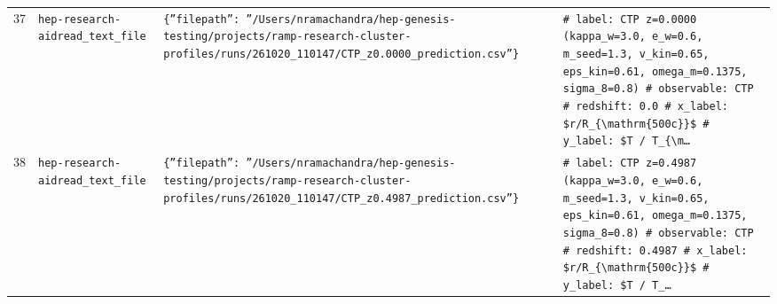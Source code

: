 \documentclass[11pt,a4paper]{article}
\begin{document}
\begin{longtable}{@{}p{}p{}p{}p{}@{}}
37 & \texttt{hep-research-aid}\newline\texttt{read\_\allowbreak{}text\_\allowbreak{}file} & \texttt{\{''filepath'':\allowbreak{} ''/\allowbreak{}Users/\allowbreak{}nramachandra/\allowbreak{}hep-genesis-testing/\allowbreak{}projects/\allowbreak{}ramp-research-cluster-profiles/\allowbreak{}runs/\allowbreak{}261020\_\allowbreak{}110147/\allowbreak{}CTP\_\allowbreak{}z0.0000\_\allowbreak{}prediction.csv''\}\allowbreak{}} & \texttt{\# label:\allowbreak{} CTP z=\allowbreak{}0.0000 (kappa\_\allowbreak{}w=\allowbreak{}3.0,\allowbreak{} e\_\allowbreak{}w=\allowbreak{}0.6,\allowbreak{} m\_\allowbreak{}seed=\allowbreak{}1.3,\allowbreak{} v\_\allowbreak{}kin=\allowbreak{}0.65,\allowbreak{} eps\_\allowbreak{}kin=\allowbreak{}0.61,\allowbreak{} omega\_\allowbreak{}m=\allowbreak{}0.1375,\allowbreak{} sigma\_\allowbreak{}8=\allowbreak{}0.8)\allowbreak{} \# observable:\allowbreak{} CTP \# redshift:\allowbreak{} 0.0 \# x\_\allowbreak{}label:\allowbreak{} \$r/\allowbreak{}R\_\allowbreak{}\{\textbackslash{}\allowbreak{}mathrm\{500c\}\allowbreak{}\}\allowbreak{}\$ \# y\_\allowbreak{}label:\allowbreak{} \$T /\allowbreak{} T\_\allowbreak{}\{\textbackslash{}\allowbreak{}m\ldots{}\allowbreak{}} \\
38 & \texttt{hep-research-aid}\newline\texttt{read\_\allowbreak{}text\_\allowbreak{}file} & \texttt{\{''filepath'':\allowbreak{} ''/\allowbreak{}Users/\allowbreak{}nramachandra/\allowbreak{}hep-genesis-testing/\allowbreak{}projects/\allowbreak{}ramp-research-cluster-profiles/\allowbreak{}runs/\allowbreak{}261020\_\allowbreak{}110147/\allowbreak{}CTP\_\allowbreak{}z0.4987\_\allowbreak{}prediction.csv''\}\allowbreak{}} & \texttt{\# label:\allowbreak{} CTP z=\allowbreak{}0.4987 (kappa\_\allowbreak{}w=\allowbreak{}3.0,\allowbreak{} e\_\allowbreak{}w=\allowbreak{}0.6,\allowbreak{} m\_\allowbreak{}seed=\allowbreak{}1.3,\allowbreak{} v\_\allowbreak{}kin=\allowbreak{}0.65,\allowbreak{} eps\_\allowbreak{}kin=\allowbreak{}0.61,\allowbreak{} omega\_\allowbreak{}m=\allowbreak{}0.1375,\allowbreak{} sigma\_\allowbreak{}8=\allowbreak{}0.8)\allowbreak{} \# observable:\allowbreak{} CTP \# redshift:\allowbreak{} 0.4987 \# x\_\allowbreak{}label:\allowbreak{} \$r/\allowbreak{}R\_\allowbreak{}\{\textbackslash{}\allowbreak{}mathrm\{500c\}\allowbreak{}\}\allowbreak{}\$ \# y\_\allowbreak{}label:\allowbreak{} \$T /\allowbreak{} T\_\allowbreak{}\ldots{}\allowbreak{}} \\

\end{longtable}
\end{document}
